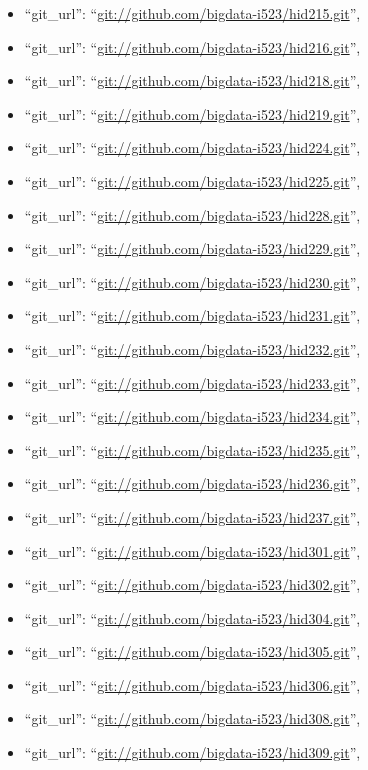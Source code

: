 \begin{itemize}
\item
  ``git\_url'': ``\url{git://github.com/bigdata-i523/hid215.git}'',
\item
  ``git\_url'': ``\url{git://github.com/bigdata-i523/hid216.git}'',
\item
  ``git\_url'': ``\url{git://github.com/bigdata-i523/hid218.git}'',
\item
  ``git\_url'': ``\url{git://github.com/bigdata-i523/hid219.git}'',
\item
  ``git\_url'': ``\url{git://github.com/bigdata-i523/hid224.git}'',
\item
  ``git\_url'': ``\url{git://github.com/bigdata-i523/hid225.git}'',
\item
  ``git\_url'': ``\url{git://github.com/bigdata-i523/hid228.git}'',
\item
  ``git\_url'': ``\url{git://github.com/bigdata-i523/hid229.git}'',
\item
  ``git\_url'': ``\url{git://github.com/bigdata-i523/hid230.git}'',
\item
  ``git\_url'': ``\url{git://github.com/bigdata-i523/hid231.git}'',
\item
  ``git\_url'': ``\url{git://github.com/bigdata-i523/hid232.git}'',
\item
  ``git\_url'': ``\url{git://github.com/bigdata-i523/hid233.git}'',
\item
  ``git\_url'': ``\url{git://github.com/bigdata-i523/hid234.git}'',
\item
  ``git\_url'': ``\url{git://github.com/bigdata-i523/hid235.git}'',
\item
  ``git\_url'': ``\url{git://github.com/bigdata-i523/hid236.git}'',
\item
  ``git\_url'': ``\url{git://github.com/bigdata-i523/hid237.git}'',
\item
  ``git\_url'': ``\url{git://github.com/bigdata-i523/hid301.git}'',
\item
  ``git\_url'': ``\url{git://github.com/bigdata-i523/hid302.git}'',
\item
  ``git\_url'': ``\url{git://github.com/bigdata-i523/hid304.git}'',
\item
  ``git\_url'': ``\url{git://github.com/bigdata-i523/hid305.git}'',
\item
  ``git\_url'': ``\url{git://github.com/bigdata-i523/hid306.git}'',
\item
  ``git\_url'': ``\url{git://github.com/bigdata-i523/hid308.git}'',
\item
  ``git\_url'': ``\url{git://github.com/bigdata-i523/hid309.git}'',

\end{itemize}
